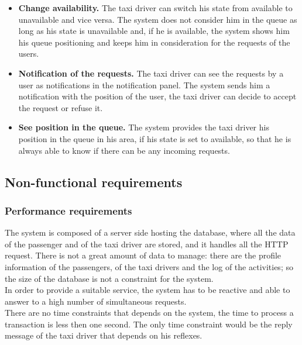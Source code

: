 \documentclass[18pt,oneside,a4paper, titlepage]{article}
\begin{document}
\begin{itemize}
			\item \textbf{Change availability.}
				The taxi driver can switch his state from available to unavailable and vice versa. The system does not consider him in the queue as long as his state is unavailable and, if he is available, the system shows him his queue positioning and keeps him in consideration for the requests of the users.
				
			\item \textbf{Notification of the requests.}
				The taxi driver can see the requests by a user as notifications in the notification panel. The system sends him a notification with the position of the user, the taxi driver can decide to accept the request or refuse it.
				
			\item \textbf{See position in the queue.}
				The system provides the taxi driver his position in the queue in his area, if his state is set to available, so that he is always able to know if there can be any incoming requests.
				
		\end{itemize}
\newpage
	\subsection{Non-functional requirements}
		\subsubsection{Performance requirements}
			The system is composed of a server side hosting the database, where all the data of the passenger and of the taxi driver are stored, and it handles all the HTTP request. There is not a great amount of data to manage: there are the profile information of the passengers, of the taxi drivers and the log of the activities; so the size of the database is not a constraint for the system.\\ In order to provide a suitable service, the system has to be reactive and able to answer to a high number of simultaneous requests.\\ There are no time constraints that depends on the system, the time to process a transaction is less then one second. The only time constraint would be the reply message of the taxi driver that depends on his reflexes.
\end{document}
